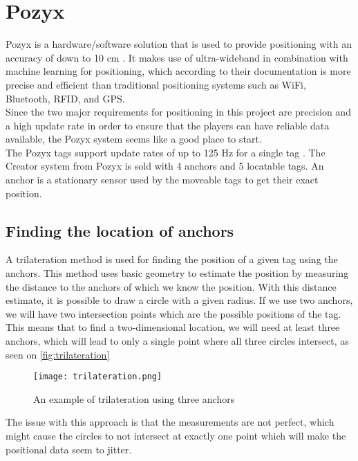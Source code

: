 \section{Pozyx}
Pozyx is a hardware/software solution that is used to provide positioning with an accuracy of down to 10 cm \cite{pozyx}.
It makes use of ultra-wideband in combination with machine learning for positioning, which according to their documentation is more precise and efficient than traditional positioning systems such as WiFi, Bluetooth, RFID, and GPS.
\\
Since the two major requirements for positioning in this project are precision and a high update rate in order to ensure that the players can have reliable data available, the Pozyx system seems like a good place to start.
\\
The Pozyx tags support update rates of up to 125 Hz for a single tag \cite{pozyx}.
The Creator system from Pozyx is sold with 4 anchors and 5 locatable tags.
An anchor is a stationary sensor used by the moveable tags to get their exact position.
\subsection{Finding the location of anchors}
A trilateration method is used for finding the position of a given tag using the anchors.
This method uses basic geometry to estimate the position by measuring the distance to the anchors of which we know the position.
With this distance estimate, it is possible to draw a circle with a given radius.
If we use two anchors, we will have two intersection points which are the possible positions of the tag.
This means that to find a two-dimensional location, we will need at least three anchors, which will lead to only a single point where all three circles intersect, as seen on \autoref{fig:trilateration}

\begin{figure}[H]
    \centering
    \texttt{[image: trilateration.png]}
    \caption{An example of trilateration using three anchors}
    \label{fig:trilateration}
\end{figure}

The issue with this approach is that the measurements are not perfect, which might cause the circles to not intersect at exactly one point which will make the positional data seem to jitter.

